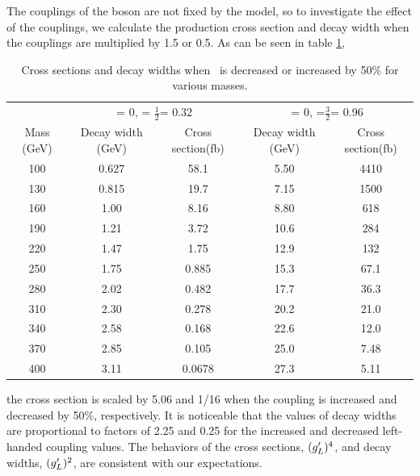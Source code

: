 The couplings of the \wprime boson are not fixed by the model, so to investigate the effect of the couplings, we calculate the production cross section and decay width when the couplings are multiplied by 1.5 or 0.5. As can be seen in table \ref{tab:XsecgLVar}, 
\begin{table}[htb]
	\centering
	\caption{Cross sections and decay widths when \gL ~is decreased or increased by 50\% for various \wprime masses. \label{tab:XsecgLVar} }
	\begin{tabular}{|c|c|c|c|c|}
		\hline 
	    & \multicolumn{2}{c|}{\gR = 0, \gL = $\frac{1}{2}$\gSM = 0.32}
		& \multicolumn{2}{c|}{\gR = 0, \gL =$\frac{3}{2}$\gSM = 0.96}\\\cline{2-5}
		\wprime Mass (GeV)  &  Decay width (GeV) &  Cross section(fb)&  Decay width (GeV) &  Cross section(fb)\\
		\hline 
		100& 0.627 & 58.1  & 5.50 & 4410\\
		130& 0.815 & 19.7  & 7.15 & 1500\\
		160& 1.00  & 8.16  & 8.80 & 618\\
		190& 1.21  & 3.72  & 10.6 & 284\\
		220& 1.47  & 1.75  & 12.9 & 132\\
		250& 1.75  & 0.885 & 15.3 & 67.1\\
		280& 2.02  & 0.482 & 17.7 & 36.3\\
		310& 2.30  & 0.278 & 20.2 & 21.0\\
		340& 2.58  & 0.168 & 22.6 & 12.0\\
		370& 2.85  & 0.105 & 25.0 & 7.48\\
		400& 3.11  & 0.0678& 27.3 & 5.11\\    
		\hline
	\end{tabular}
\end{table}  
the cross section is scaled by 5.06 and 1/16 when the coupling is increased and decreased by 50\%, respectively. It is noticeable that the values of decay widths are proportional to  factors of 2.25 and  0.25 for the increased  and decreased left-handed coupling values. The behaviors of the cross sections, $(g^\prime_L)^4$, and decay widths, $(g^\prime_L)^2$, are consistent with our expectations.



